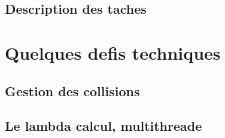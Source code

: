 \documentclass[french,12pt]{article}
\begin{document}


\subsection{Description des taches}



\section{Quelques defis techniques}


\subsection{Gestion des collisions}


\subsection{Le lambda calcul, multithreade}


\newpage
\listoffigures
\newpage
\end{document}
